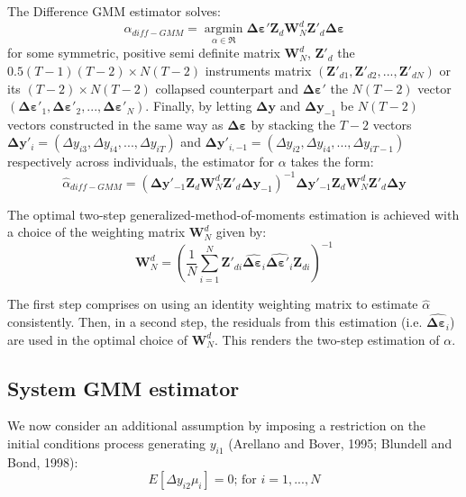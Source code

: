 The Difference GMM estimator solves:
\[
{{\hat \alpha }_{diff - GMM}} = \mathop {\arg \min }\limits_{\alpha  \in \Re } \mathbf{\Delta \varepsilon}' \mathbf{Z}_{d}{\mathbf{W}_{N}^d}\mathbf{Z}'_{d}\mathbf{\Delta \varepsilon} 
\]
for some symmetric, positive semi definite matrix $\mathbf{W}_{N}^d$, $\mathbf{Z}'_{d}$ the $0.5(T-1)(T-2)\times N(T-2)$ instruments matrix $(\mathbf{Z}'_{d1},\mathbf{Z}'_{d2},...,\mathbf{Z}'_{dN})$ or its $(T-2)\times N(T-2)$ collapsed counterpart and $\mathbf{\Delta \varepsilon}'$ the $N(T-2)$ vector $(\mathbf{\Delta \varepsilon}'_1,\mathbf{\Delta \varepsilon}'_2,...,\mathbf{\Delta \varepsilon}'_N)$. Finally, by letting $\mathbf{\Delta y}$ and $\mathbf{\Delta y}_{-1}$ be $N(T-2)$ vectors constructed in the same way as $\mathbf{\Delta \varepsilon}$ by stacking the $T-2$ vectors $\mathbf{\Delta y}'_i=(\Delta y_{i3},\Delta y_{i4},...,\Delta y_{iT})$ and $\mathbf{\Delta y}'_{i,-1}=(\Delta y_{i2},\Delta y_{i4},...,\Delta y_{iT-1})$ respectively across individuals, the estimator for $\alpha$ takes the form:
\[
{{\hat \alpha }_{diff - GMM}} = {\left( \mathbf{\Delta y}'_{-1}\mathbf{Z}_d \mathbf{W}_{N}^d \mathbf{Z}'_d \mathbf{\Delta y}_{-1} \right)^{ - 1}} \mathbf{\Delta y}'_{-1}\mathbf{Z}_d \mathbf{W}_{N}^d \mathbf{Z}'_d \mathbf{\Delta y} 
\]

The optimal two-step generalized-method-of-moments estimation is achieved with a choice of the weighting matrix $\mathbf{W}_{N}^d$ given by:
\[
\mathbf{W}_{N}^d=\left( \frac{1}{N} \sum\limits_{i=1}^{N} \mathbf{Z}'_{di} \hat{ \mathbf{\Delta \varepsilon}_i} \hat{ \mathbf{\Delta \varepsilon}'_i} \mathbf{Z}_{di} \right)^{-1}
\]

The first step comprises on using an identity weighting matrix to estimate $\hat \alpha$ consistently. Then, in a second step, the residuals from this estimation (i.e. $\hat{\mathbf{\Delta \varepsilon}_i}$) are used in the optimal choice of $\mathbf{W}_{N}^d$. This renders the two-step estimation of $ \alpha$.

\subsection*{System GMM estimator}

We now consider an additional assumption by imposing a restriction on the initial conditions process generating $y_{i1}$ (Arellano and Bover, 1995; Blundell and Bond, 1998):
\begin{equation}
\label{as4}
\tag{6'}
E\left[\Delta y_{i2}\mu_{i}\right]=0\text{; for $i=1,...,N$}
\end{equation}

